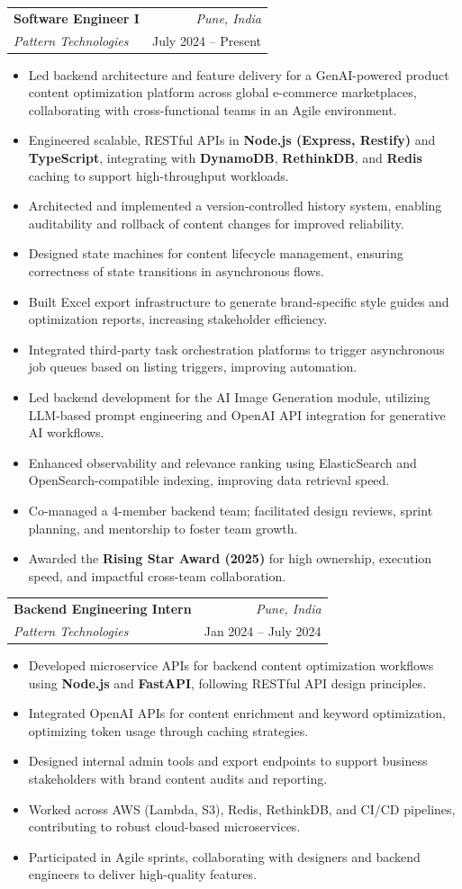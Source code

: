 \documentclass[a4paper,11pt]{article}
\makeatletter
\newcommand{\resumeSubheading}[4]{
\vspace{0.5mm}\item
    \begin{tabular*}{0.98\textwidth}[t]{l@{\extracolsep{\fill}}r}
        \textbf{#1} & \textit{\footnotesize{#4}} \\
        \textit{\footnotesize{#3}} &  \footnotesize{#2}\\
    \end{tabular*}
    \vspace{-2.4mm}
}
\newcommand{\resumeItemListStart}{\begin{justify}\begin{itemize}[leftmargin=3ex, rightmargin=2ex, noitemsep,labelsep=1.2mm,itemsep=0mm]\small}
\newcommand{\resumeItemListEnd}{\end{itemize}\end{justify}\vspace{-2mm}}
\makeatother
\begin{document}
\resumeSubheading
{Software Engineer I}{July 2024 -- Present}
{Pattern Technologies}{Pune, India}
\resumeItemListStart
\item {Led backend architecture and feature delivery for a GenAI-powered product content optimization platform across global e-commerce marketplaces, collaborating with cross-functional teams in an Agile environment.}
\item {Engineered scalable, RESTful APIs in \textbf{Node.js (Express, Restify)} and \textbf{TypeScript}, integrating with \textbf{DynamoDB}, \textbf{RethinkDB}, and \textbf{Redis} caching to support high-throughput workloads.}
\item {Architected and implemented a version-controlled history system, enabling auditability and rollback of content changes for improved reliability.}
\item {Designed state machines for content lifecycle management, ensuring correctness of state transitions in asynchronous flows.}
\item {Built Excel export infrastructure to generate brand-specific style guides and optimization reports, increasing stakeholder efficiency.}
\item {Integrated third-party task orchestration platforms to trigger asynchronous job queues based on listing triggers, improving automation.}
\item {Led backend development for the AI Image Generation module, utilizing LLM-based prompt engineering and OpenAI API integration for generative AI workflows.}
\item {Enhanced observability and relevance ranking using ElasticSearch and OpenSearch-compatible indexing, improving data retrieval speed.}
\item {Co-managed a 4-member backend team; facilitated design reviews, sprint planning, and mentorship to foster team growth.}
\item {Awarded the \textbf{Rising Star Award (2025)} for high ownership, execution speed, and impactful cross-team collaboration.}
\resumeItemListEnd

\resumeSubheading
{Backend Engineering Intern}{Jan 2024 -- July 2024}
{Pattern Technologies}{Pune, India}
\resumeItemListStart
\item {Developed microservice APIs for backend content optimization workflows using \textbf{Node.js} and \textbf{FastAPI}, following RESTful API design principles.}
\item {Integrated OpenAI APIs for content enrichment and keyword optimization, optimizing token usage through caching strategies.}
\item {Designed internal admin tools and export endpoints to support business stakeholders with brand content audits and reporting.}
\item {Worked across AWS (Lambda, S3), Redis, RethinkDB, and CI/CD pipelines, contributing to robust cloud-based microservices.}
\item {Participated in Agile sprints, collaborating with designers and backend engineers to deliver high-quality features.}
\resumeItemListEnd
\end{document}
